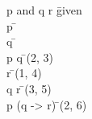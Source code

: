 \documentclass{article}
\begin{document}
\begin{proofbox}
\: p and q \rightarrow r \= \hbox{given} \\
\open
\: p \= \asm \\
\open
\: q \= \asm \\
\: p \land q \= \andintro(2, 3) \\
\: r \= \implieselim(1, 4) \\
\close
\: q \rightarrow r \= \impliesintro(3, 5) \\
\close
\: p \rightarrow (q -> r) \= \impliesintro(2, 6) \\
\end{proofbox}
\end{document}
